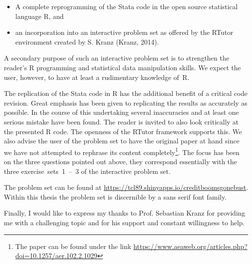 \documentclass[a4paper,11pt,abstract=on]{scrartcl}
\let\rmarkdownfootnote\footnote%
\def\footnote{\protect\rmarkdownfootnote}
\begin{document}
\begin{itemize}
\item A complete reprogramming of the Stata code in the open source statistical language R, and 
\item an incorporation into an interactive problem set as offered by the RTutor environment created by S. Kranz (Kranz, 2014). 
\end{itemize}

A secondary purpose of such an interactive problem set is to strengthen the reader’s R programming and statistical data manipulation skills. We expect the user, however, to have at least a rudimentary knowledge of~R.

The replication of the Stata code in R has the additional benefit of a critical code revision. Great emphasis has been given to replicating the results as accurately as possible. In the course of this undertaking several inaccuracies and at least one serious mistake have been found. The reader is invited to also look critically at the presented R code. The openness of the RTutor framework supports this. We also advise the user of the problem set to have the original paper at hand since we have not attempted to rephrase its content completely\footnote{The paper can be found under the link \url{https://www.aeaweb.org/articles.php?doi=10.1257/aer.102.2.1029}}. The focus has been on the three questions pointed out above, they correspond essentially with the three exercise~sets~1~–~3 of the interactive problem set.

The problem set can be found at \url{https://tcl89.shinyapps.io/creditboomsgonebust}. Within this thesis the problem set is discernible by a {\sf sans serif font family}.

Finally, I would like to express my thanks to Prof. Sebastian Kranz for providing me with a challenging topic and for his support and constant willingness to help.

\eject
\end{document}
